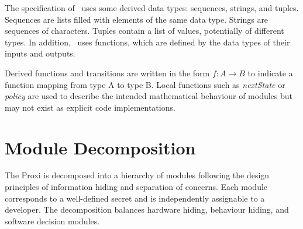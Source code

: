 \documentclass[12pt, titlepage]{article}
\begin{document}
\noindent The specification of \progname\ uses some derived data types:
sequences, strings, and tuples. Sequences are lists filled with elements of the
same data type. Strings are sequences of characters. Tuples contain a list of
values, potentially of different types. In addition, \progname\ uses functions,
which are defined by the data types of their inputs and outputs.

\noindent Derived functions and transitions are written in the form
$f : A \rightarrow B$ to indicate a function mapping from type A to type B.
Local functions such as \textit{nextState} or \textit{policy} are used to
describe the intended mathematical behaviour of modules but may not exist as
explicit code implementations.

\section{Module Decomposition}

The Proxi is decomposed into a hierarchy of modules following the design
principles of information hiding and separation of concerns. Each module
corresponds to a well-defined secret and is independently assignable to a
developer. The decomposition balances hardware hiding, behaviour hiding, and
software decision modules.
\end{document}
